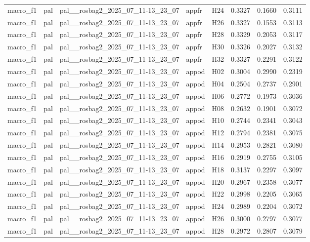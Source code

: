 \begin{table}[tbp]
\begin{tabular}{lllllrrr}
macro\_f1 & pal & pal\_\_rosbag2\_2025\_07\_11-13\_23\_07 & appfr & H24 & 0.3327 & 0.1660 & 0.3111 \\
macro\_f1 & pal & pal\_\_rosbag2\_2025\_07\_11-13\_23\_07 & appfr & H26 & 0.3327 & 0.1553 & 0.3113 \\
macro\_f1 & pal & pal\_\_rosbag2\_2025\_07\_11-13\_23\_07 & appfr & H28 & 0.3329 & 0.2053 & 0.3117 \\
macro\_f1 & pal & pal\_\_rosbag2\_2025\_07\_11-13\_23\_07 & appfr & H30 & 0.3326 & 0.2027 & 0.3132 \\
macro\_f1 & pal & pal\_\_rosbag2\_2025\_07\_11-13\_23\_07 & appfr & H32 & 0.3327 & 0.2291 & 0.3122 \\
macro\_f1 & pal & pal\_\_rosbag2\_2025\_07\_11-13\_23\_07 & appod & H02 & 0.3004 & 0.2990 & 0.2319 \\
macro\_f1 & pal & pal\_\_rosbag2\_2025\_07\_11-13\_23\_07 & appod & H04 & 0.2504 & 0.2737 & 0.2901 \\
macro\_f1 & pal & pal\_\_rosbag2\_2025\_07\_11-13\_23\_07 & appod & H06 & 0.2772 & 0.1973 & 0.3036 \\
macro\_f1 & pal & pal\_\_rosbag2\_2025\_07\_11-13\_23\_07 & appod & H08 & 0.2632 & 0.1901 & 0.3072 \\
macro\_f1 & pal & pal\_\_rosbag2\_2025\_07\_11-13\_23\_07 & appod & H10 & 0.2744 & 0.2341 & 0.3043 \\
macro\_f1 & pal & pal\_\_rosbag2\_2025\_07\_11-13\_23\_07 & appod & H12 & 0.2794 & 0.2381 & 0.3075 \\
macro\_f1 & pal & pal\_\_rosbag2\_2025\_07\_11-13\_23\_07 & appod & H14 & 0.2953 & 0.2821 & 0.3080 \\
macro\_f1 & pal & pal\_\_rosbag2\_2025\_07\_11-13\_23\_07 & appod & H16 & 0.2919 & 0.2755 & 0.3105 \\
macro\_f1 & pal & pal\_\_rosbag2\_2025\_07\_11-13\_23\_07 & appod & H18 & 0.3137 & 0.2297 & 0.3097 \\
macro\_f1 & pal & pal\_\_rosbag2\_2025\_07\_11-13\_23\_07 & appod & H20 & 0.2967 & 0.2358 & 0.3077 \\
macro\_f1 & pal & pal\_\_rosbag2\_2025\_07\_11-13\_23\_07 & appod & H22 & 0.2998 & 0.2205 & 0.3065 \\
macro\_f1 & pal & pal\_\_rosbag2\_2025\_07\_11-13\_23\_07 & appod & H24 & 0.2989 & 0.2204 & 0.3072 \\
macro\_f1 & pal & pal\_\_rosbag2\_2025\_07\_11-13\_23\_07 & appod & H26 & 0.3000 & 0.2797 & 0.3077 \\
macro\_f1 & pal & pal\_\_rosbag2\_2025\_07\_11-13\_23\_07 & appod & H28 & 0.2972 & 0.2807 & 0.3079 \\

\end{tabular}
\end{table}
